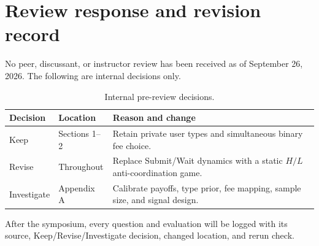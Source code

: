 \section{Review response and revision record}
No peer, discussant, or instructor review has been received as of September 26, 2026. The following are internal decisions only.
\begin{table}[h]\caption{Internal pre-review decisions.}
\begin{tabularx}{\columnwidth}{@{}p{1.15cm}p{1.5cm}Y@{}}\toprule
\textbf{Decision}&\textbf{Location}&\textbf{Reason and change}\\\midrule
Keep&Sections 1--2&Retain private user types and simultaneous binary fee choice.\\
Revise&Throughout&Replace Submit/Wait dynamics with a static $H/L$ anti-coordination game.\\
Investigate&Appendix A&Calibrate payoffs, type prior, fee mapping, sample size, and signal design.\\\bottomrule
\end{tabularx}\end{table}
After the symposium, every question and evaluation will be logged with its source, Keep/Revise/Investigate decision, changed location, and rerun check.

\clearpage\onecolumn

